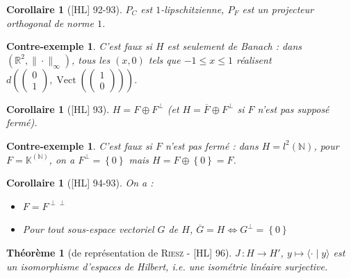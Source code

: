 \documentclass[10pt, a4paper, parskip=full, twoside, twocolumn]{report}
\newtheorem{theorem}[definition]{Théorème}
\newtheorem{corollary}[definition]{Corollaire}
\newtheorem{cexample}[definition]{Contre-exemple}
\newcommand{\IN}{\mathbb{N}}
\newcommand{\IK}{\mathbb{K}}
\newcommand{\IR}{\mathbb{R}}
\newcommand{\ps}[2]{\langle #1\mid #2\rangle}
\DeclareMathOperator{\Vect}{Vect}
\begin{document}
\begin{corollary}[\textnormal{[HL] 92-93}]
	$P_C$ est $1$-lipschitzienne, $P_F$ est un projecteur orthogonal de norme $1$.
\end{corollary}

\begin{cexample}
	C'est faux si $H$ est seulement de Banach : dans $(\IR^2,\|\cdot\|_{\infty})$, tous les $(x,0)$ tels que $-1\leq x\leq 1$ réalisent $d\left(\begin{pmatrix}
		0\\1
	\end{pmatrix}, \Vect\left(\begin{pmatrix}
		1\\0
	\end{pmatrix}\right)\right)$.
\end{cexample}

\begin{corollary}[\textnormal{[HL] 93}]
	$H = F\oplus F^{\perp}$ (et $H = \overline{F}\oplus F^{\perp}$ si $F$ n'est pas supposé fermé).
\end{corollary}

\begin{cexample}
	C'est faux si $F$ n'est pas fermé : dans $H = l^2(\IN)$, pour $F = \IK^{(\IN)}$, on a $F^{\perp} = \left\{0\right\}$ mais $H = F\oplus \left\{0\right\} = F$.
\end{cexample}

\begin{corollary}[\textnormal{[HL] 94-93}]
	On a :
	\begin{itemize}
		\item $F = F^{\perp\perp}$
		\item Pour tout sous-espace vectoriel $G$ de $H$, $\overline{G} = H \iff G^{\perp} = \left\{0\right\}$
	\end{itemize}
\end{corollary}


\begin{tcolorbox}[
    breakable, %
    colback=developpement, %
    colframe=gray!0!black, %
    boxrule=0pt, %
    arc=1mm, %
	boxsep=0pt,
	left=0pt, right=0pt, top=0pt, bottom=0pt
]
\begin{theorem}[de représentation de \textsc{Riesz} - \textnormal{[HL] 96}]
	\label{213dev1b}
	$J\,\colon H\to H'$, $y\mapsto\ps{\cdot}{y}$ est un isomorphisme d'espaces de Hilbert, \emph{i.e.} une isométrie linéaire surjective.
\end{theorem}
\end{tcolorbox}
\end{document}
